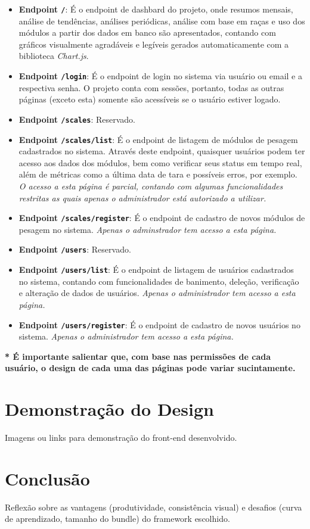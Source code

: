 \documentclass[11pt]{article}
\begin{document}
\begin{itemize}
    \item \textbf{Endpoint \texttt{/}}: É o endpoint de dashbard do projeto, onde resumos mensais, análise de tendências, análises periódicas, análise com base em raças e uso dos módulos a partir dos dados em banco são apresentados, contando com gráficos visualmente agradáveis e legíveis gerados automaticamente com a biblioteca \textit{Chart.js}.
    \item \textbf{Endpoint \texttt{/login}}: É o endpoint de login no sistema via usuário ou email e a respectiva senha. O projeto conta com sessões, portanto, todas as outras páginas (exceto esta) somente são acessíveis se o usuário estiver logado.
    \item \textbf{Endpoint \texttt{/scales}}: Reservado.
    \item \textbf{Endpoint \texttt{/scales/list}}: É o endpoint de listagem de módulos de pesagem cadastrados no sistema. Através deste endpoint, quaisquer usuários podem ter acesso aos dados dos módulos, bem como verificar seus status em tempo real, além de métricas como a última data de tara e possíveis erros, por exemplo. \textit{O acesso a esta página é parcial, contando com algumas funcionalidades restritas as quais apenas o administrador está autorizado a utilizar.}
     \item \textbf{Endpoint \texttt{/scales/register}}: É o endpoint de cadastro de novos módulos de pesagem no sistema. \textit{Apenas o adminstrador tem acesso a esta página.}
     \item \textbf{Endpoint \texttt{/users}}: Reservado.
     \item \textbf{Endpoint \texttt{/users/list}}: É o endpoint de listagem de usuários cadastrados no sistema, contando com funcionalidades de banimento, deleção, verificação e alteração de dados de usuários. \textit{Apenas o administrador tem acesso a esta página.}
     \item \textbf{Endpoint \texttt{/users/register}}: É o endpoint de cadastro de novos usuários no sistema. \textit{Apenas o administrador tem acesso a esta página.}
\end{itemize}

\textbf{* É importante salientar que, com base nas permissões de cada usuário, o design de cada uma das páginas pode variar sucintamente.}

\section{Demonstração do Design}

Imagens ou links para demonstração do front-end desenvolvido.

\section{Conclusão}

Reflexão sobre as vantagens (produtividade, consistência visual) e desafios (curva de aprendizado, tamanho do bundle) do framework escolhido.

% 
% 
\end{document}
